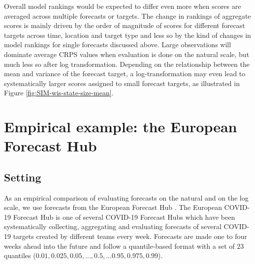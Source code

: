 \documentclass{article}
\begin{document}
Overall model rankings would be expected to differ even more when scores are averaged across multiple forecasts or targets. The change in rankings of aggregate scores is mainly driven by the order of magnitude of scores for different forecast targets across time, location and target type and less so by the kind of changes in model rankings for single forecasts discussed above. Large observations will dominate average CRPS values when evaluation is done on the natural scale, but much less so after log transformation. Depending on the relationship between the mean and variance of the forecast target, a log-transformation may even lead to systematically larger scores assigned to small forecast targets, as illustrated in Figure \ref{fig:SIM-wis-state-size-mean}. 

\section{Empirical example: the European Forecast Hub}
\label{sec:HUB}

\subsection{Setting}
\label{sec:HUB-setting}

As an empirical comparison of evaluating forecasts on the natural and on the log scale, we use forecasts from the European Forecast Hub \citep{europeancovid-19forecasthubEuropeanCovid19Forecast2021, sherrattPredictivePerformanceMultimodel2022}. 
The European COVID-19 Forecast Hub is one of several COVID-19 Forecast Hubs \citep{cramerEvaluationIndividualEnsemble2021, bracherShorttermForecastingCOVID192021} which have been systematically collecting, aggregating and evaluating forecasts of several COVID-19 targets created by different teams every week. Forecasts are made one to four weeks ahead into the future and follow a quantile-based format with a set of 23 quantiles ($0.01, 0.025, 0.05, ..., 0.5, ... 0.95, 0.975, 0.99$). 
\end{document}
